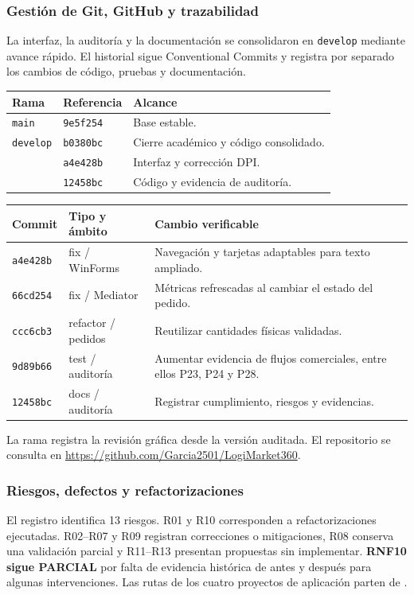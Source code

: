 \subsubsection{Gestión de Git, GitHub y trazabilidad}
La interfaz, la auditoría y la documentación se consolidaron en \texttt{develop} mediante avance rápido. El historial sigue Conventional Commits y registra por separado los cambios de código, pruebas y documentación.

\begin{longtable}{@{}L{.36\linewidth}L{.17\linewidth}L{.40\linewidth}@{}}
\toprule Rama & Referencia & Alcance \\ \midrule\endhead
\texttt{main} & \texttt{9e5f254} & Base estable. \\
\texttt{develop} & \texttt{b0380bc} & Cierre académico y código consolidado. \\
 & \texttt{a4e428b} & Interfaz y corrección DPI. \\
 & \texttt{12458bc} & Código y evidencia de auditoría. \\
\bottomrule
\end{longtable}

\begin{longtable}{@{}L{.16\linewidth}L{.22\linewidth}L{.56\linewidth}@{}}
\toprule Commit & Tipo y ámbito & Cambio verificable \\ \midrule\endhead
\texttt{a4e428b} & fix / WinForms & Navegación y tarjetas adaptables para texto ampliado. \\
\texttt{66cd254} & fix / Mediator & Métricas refrescadas al cambiar el estado del pedido. \\
\texttt{ccc6cb3} & refactor / pedidos & Reutilizar cantidades físicas validadas. \\
\texttt{9d89b66} & test / auditoría & Aumentar evidencia de flujos comerciales, entre ellos P23, P24 y P28. \\
\texttt{12458bc} & docs / auditoría & Registrar cumplimiento, riesgos y evidencias. \\
\bottomrule
\end{longtable}

La rama  registra la revisión gráfica desde la versión auditada. El repositorio se consulta en \url{https://github.com/Garcia2501/LogiMarket360}.

\subsubsection{Riesgos, defectos y refactorizaciones}\label{sec:riesgos}
El registro identifica 13 riesgos. R01 y R10 corresponden a refactorizaciones ejecutadas. R02--R07 y R09 registran correcciones o mitigaciones, R08 conserva una validación parcial y R11--R13 presentan propuestas sin implementar. \textbf{RNF10 sigue PARCIAL} por falta de evidencia histórica de antes y después para algunas intervenciones. Las rutas de los cuatro proyectos de aplicación parten de .

